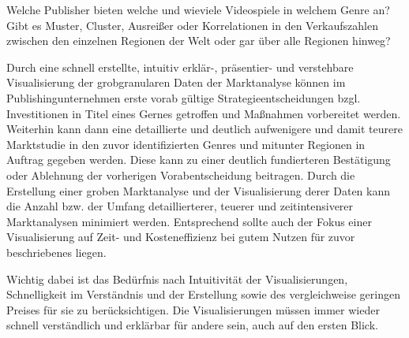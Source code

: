 \documentclass[usegeometry=true]{scrartcl}
\begin{document}
Welche Publisher bieten welche und wieviele Videospiele in welchem Genre an?
Gibt es Muster, Cluster, Ausreißer oder Korrelationen in den Verkaufszahlen zwischen den einzelnen Regionen der Welt oder gar über alle Regionen hinweg?

Durch eine schnell erstellte, intuitiv erklär-, präsentier- und verstehbare Visualisierung der grobgranularen Daten der Marktanalyse können im Publishingunternehmen erste vorab gültige Strategieentscheidungen bzgl. Investitionen in Titel eines Gernes getroffen und Maßnahmen vorbereitet werden.
Weiterhin kann dann eine detaillierte und deutlich aufwenigere und damit teurere Marktstudie in den zuvor identifizierten Genres und mitunter Regionen in Auftrag gegeben werden. 
Diese kann zu einer deutlich fundierteren Bestätigung oder Ablehnung der vorherigen Vorabentscheidung beitragen. 
Durch die Erstellung einer groben Marktanalyse und der Visualisierung derer Daten kann die Anzahl bzw. der Umfang detaillierterer, teuerer und zeitintensiverer Marktanalysen minimiert werden.
Entsprechend sollte auch der Fokus einer Visualisierung auf Zeit- und Kosteneffizienz bei gutem Nutzen für zuvor beschriebenes liegen.

Wichtig dabei ist das Bedürfnis nach Intuitivität der Visualisierungen, Schnelligkeit im Verständnis und der Erstellung sowie des vergleichweise geringen Preises für sie zu berücksichtigen. 
Die Visualisierungen müssen immer wieder schnell verständlich und erklärbar für andere sein, auch auf den ersten Blick.
\end{document}
